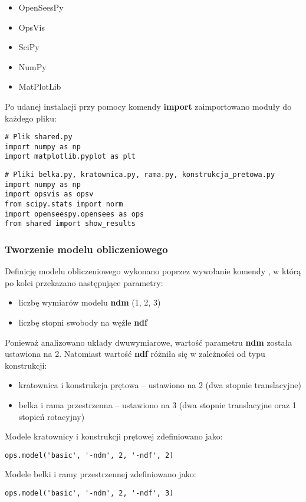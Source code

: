 \begin{itemize}
    \item OpenSeesPy
    \item OpsVis
    \item SciPy
    \item NumPy
    \item MatPlotLib
\end{itemize}

Po udanej instalacji przy pomocy komendy \textbf{import} zaimportowano moduły do każdego pliku:

\begin{lstlisting}
# Plik shared.py
import numpy as np
import matplotlib.pyplot as plt
\end{lstlisting}

\begin{lstlisting}
# Pliki belka.py, kratownica.py, rama.py, konstrukcja_pretowa.py
import numpy as np
import opsvis as opsv
from scipy.stats import norm
import openseespy.opensees as ops
from shared import show_results
\end{lstlisting}

\subsubsection{Tworzenie modelu obliczeniowego}

Definicję modelu obliczeniowego wykonano poprzez wywołanie komendy
, w którą po kolei przekazano następujące parametry:

\begin{itemize}
    \item liczbę wymiarów modelu \textbf{ndm} (1, 2, 3)
    \item liczbę stopni swobody na węźle \textbf{ndf}
\end{itemize}

Ponieważ analizowano układy dwuwymiarowe, wartość parametru \textbf{ndm} została ustawiona na 2.
Natomiast wartość \textbf{ndf} różniła się w zależności od typu konstrukcji:
\begin{itemize}
    \item kratownica i konstrukcja prętowa – ustawiono na 2 (dwa stopnie translacyjne)
    \item belka i rama przestrzenna – ustawiono na 3 (dwa stopnie translacyjne oraz 1 stopień rotacyjny)
\end{itemize}
Modele kratownicy i konstrukcji prętowej zdefiniowano jako:
\begin{lstlisting}
ops.model('basic', '-ndm', 2, '-ndf', 2)
\end{lstlisting}
Modele belki i ramy przestrzennej zdefiniowano jako:
\begin{lstlisting}
ops.model('basic', '-ndm', 2, '-ndf', 3)
\end{lstlisting}

